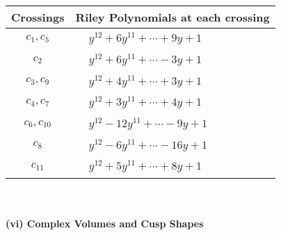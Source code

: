 \documentclass[1p]{elsarticle_modified}
\theoremstyle{definition}
\begin{document}
\begin{tabular}{m{50pt}|m{274pt}}
Crossings & \hspace{64pt}Riley Polynomials at each crossing \\
\hline $$\begin{aligned}c_{1},c_{5}\end{aligned}$$&$\begin{aligned}
&y^{12}+6 y^{11}+\cdots+9 y+1
\end{aligned}$\\
\hline $$\begin{aligned}c_{2}\end{aligned}$$&$\begin{aligned}
&y^{12}+6 y^{11}+\cdots-3 y+1
\end{aligned}$\\
\hline $$\begin{aligned}c_{3},c_{9}\end{aligned}$$&$\begin{aligned}
&y^{12}+4 y^{11}+\cdots+3 y+1
\end{aligned}$\\
\hline $$\begin{aligned}c_{4},c_{7}\end{aligned}$$&$\begin{aligned}
&y^{12}+3 y^{11}+\cdots+4 y+1
\end{aligned}$\\
\hline $$\begin{aligned}c_{6},c_{10}\end{aligned}$$&$\begin{aligned}
&y^{12}-12 y^{11}+\cdots-9 y+1
\end{aligned}$\\
\hline $$\begin{aligned}c_{8}\end{aligned}$$&$\begin{aligned}
&y^{12}-6 y^{11}+\cdots-16 y+1
\end{aligned}$\\
\hline $$\begin{aligned}c_{11}\end{aligned}$$&$\begin{aligned}
&y^{12}+5 y^{11}+\cdots+8 y+1
\end{aligned}$\\
\hline
\end{tabular}\\~\\
\newpage\flushleft \textbf{(vi) Complex Volumes and Cusp Shapes}
\end{document}
